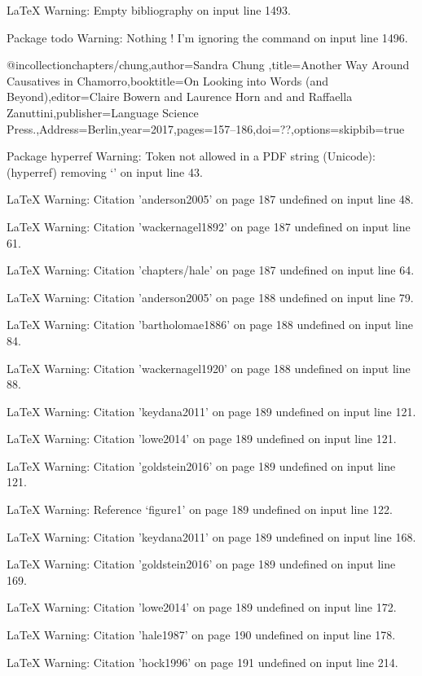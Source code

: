 LaTeX Warning: Empty bibliography on input line 1493.


Package todo Warning: Nothing \todo! I'm ignoring the \todos command on input line 1496.

@incollection{chapters/chung,author={Sandra Chung },title={{Another Way Around Causatives in Chamorro}},booktitle={{On Looking into Words (and Beyond)}},editor={Claire Bowern and  Laurence Horn and  and Raffaella Zanuttini},publisher={Language Science Press.},Address={Berlin},year=2017,pages={157--186},doi={??},options={skipbib=true}}

Package hyperref Warning: Token not allowed in a PDF string (Unicode):
(hyperref)                removing `\newline' on input line 43.


LaTeX Warning: Citation 'anderson2005' on page 187 undefined on input line 48.


LaTeX Warning: Citation 'wackernagel1892' on page 187 undefined on input line 61.


LaTeX Warning: Citation 'chapters/hale' on page 187 undefined on input line 64.


LaTeX Warning: Citation 'anderson2005' on page 188 undefined on input line 79.


LaTeX Warning: Citation 'bartholomae1886' on page 188 undefined on input line 84.


LaTeX Warning: Citation 'wackernagel1920' on page 188 undefined on input line 88.


LaTeX Warning: Citation 'keydana2011' on page 189 undefined on input line 121.


LaTeX Warning: Citation 'lowe2014' on page 189 undefined on input line 121.


LaTeX Warning: Citation 'goldstein2016' on page 189 undefined on input line 121.


LaTeX Warning: Reference `figure1' on page 189 undefined on input line 122.


LaTeX Warning: Citation 'keydana2011' on page 189 undefined on input line 168.


LaTeX Warning: Citation 'goldstein2016' on page 189 undefined on input line 169.


LaTeX Warning: Citation 'lowe2014' on page 189 undefined on input line 172.


LaTeX Warning: Citation 'hale1987' on page 190 undefined on input line 178.


LaTeX Warning: Citation 'hock1996' on page 191 undefined on input line 214.


